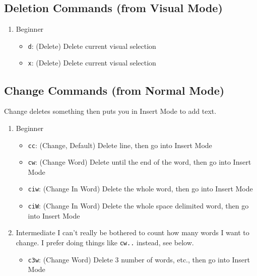 \documentclass[11pt]{article}
\begin{document}
\subsection{Deletion Commands (from Visual Mode)}
\label{sec:org8233b70}
\begin{enumerate}
\item Beginner
\label{sec:org172b5e9}
\begin{itemize}
\item \texttt{d}: (Delete) Delete current visual selection
\item \texttt{x}: (Delete) Delete current visual selection
\end{itemize}
\end{enumerate}
\subsection{Change Commands (from Normal Mode)}
\label{sec:org0999919}
Change deletes something then puts you in Insert Mode
to add text.
\begin{enumerate}
\item Beginner
\label{sec:orgadc3829}
\begin{itemize}
\item \texttt{cc}: (Change, Default) Delete line, then go into Insert Mode
\item \texttt{cw}: (Change Word) Delete until the end of the word, then go into Insert Mode
\item \texttt{ciw}: (Change In Word) Delete the whole word, then go into Insert Mode
\item \texttt{ciW}: (Change In Word) Delete the whole space delimited word, then go into Insert Mode
\end{itemize}
\item Intermediate
\label{sec:org1344c61}
I can't really be bothered to count how many words I want to change.
I prefer doing things like \texttt{cw..} instead, see below.
\begin{itemize}
\item \texttt{c3w}: (Change Word) Delete 3 number of words, etc., then go into Insert Mode
\end{itemize}
\end{enumerate}
\end{document}
